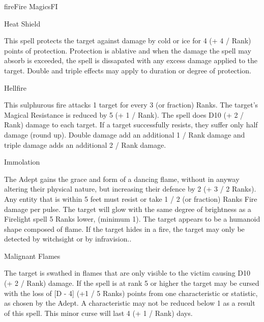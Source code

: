 \begin{college}[2.0]{fire}{Fire Magics}{FI}
\begin{spell}[S-5]{Heat Shield}
\begin{effects}
This spell protects the target against damage by cold or ice for 4 (+
4 / Rank) points of protection.  Protection is ablative and when the
damage the spell may absorb is exceeded, the spell is dissapated with
any excess damage applied to the target. Double and triple effects may
apply to duration or degree of protection.
\end{effects}
\end{spell}

\begin{spell}[S-6]{Hellfire}
\begin{effects}
This sulphurous fire attacks 1 target for every 3 (or fraction)
Ranks. The target's Magical Resistance is reduced by 5 (+ 1 / Rank).
The spell does D10 (+ 2 / Rank) damage to each target. If a target
successfully resists, they suffer only half damage (round up).  Double
damage add an additional 1 / Rank damage and triple damage adds an
additional 2 / Rank damage.
\end{effects}
\end{spell}

\begin{spell}[S-7]{Immolation}
\begin{effects}
The Adept gains the grace and form of a dancing flame, without in
anyway altering their physical nature, but increasing their defence by
2 (+ 3 / 2 Ranks). Any entity that is within 5 feet must resist or
take 1 / 2 (or fraction) Ranks Fire damage per pulse. The target will
glow with the same degree of brightness as a Firelight spell 5 Ranks
lower, (minimum 1). The target appears to be a humanoid shape composed
of flame. If the target hides in a fire, the target may only be
detected by witchsight or by infravision..
\end{effects}
\end{spell}

\begin{spell}[S-8]{Malignant Flames}
\begin{effects}
The target is swathed in flames that are only visible to the victim
causing D10 (+ 2 / Rank) damage.  If the spell is at rank 5 or higher
the target may be cursed with the loss of [D - 4] (+1 / 5 Ranks)
points from one characteristic or statistic, as chosen by the Adept. A
characteristic may not be reduced below 1 as a result of this
spell. This minor curse will last 4 (+ 1 / Rank) days.
\end{effects}
\end{spell}


\end{college}
